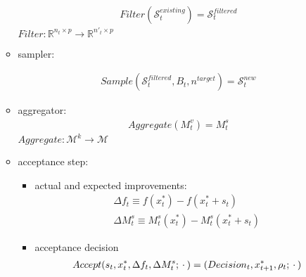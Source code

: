 \begin{itemize}
\begin{itemize}
            \begin{align}
                Filter(\mathcal{S}_t^{existing})=\mathcal{S}_t^{filtered}
            \end{align}
                        $Filter: \mathbb{R}^{n_t\times p}\rightarrow\mathbb{R}^{n{'}_t\times p}$
            \item sampler:

            \begin{align}
                Sample(\mathcal{S}_t^{filtered},B_t,n^{target})=\mathcal{S}_t^{new}
            \end{align}
            \item aggregator:
                \begin{align}
                    Aggregate(M_t^{v})=M_t^{s}
                \end{align}
                $Aggregate:\mathcal{M}^k\rightarrow\mathcal{M}$
            \item acceptance step:
            \begin{itemize}
                \item actual and expected improvements:
                    \begin{align}
                        \Delta f_t\equiv f(x_t^*)-f(x^*_t+s_t )\\
                        \Delta M^s_t\equiv M_t^s(x_t^*)-M_t^s(x^*_t+s_t )
                    \end{align}
                \item acceptance decision
                    \begin{align}
                        Accept(s_t,x_t^{*},\Delta f_t,\Delta M_t^s;\hspace{0.2em}\cdot\hspace{0.2em})=(Decision_t,x_{t+1}^{*},\rho_t;\hspace{0.2em}\cdot\hspace{0.2em})
                    \end{align}
            \end{itemize}


\end{itemize}
\end{itemize}
